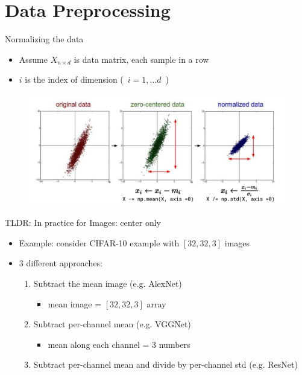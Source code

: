 \documentclass[serif, aspectratio=169]{beamer}
\begin{document}
\section{Data Preprocessing}

\begin{frame}{Normalizing the data}
	\begin{itemize}
		\item Assume $X_{n \times d}$ is data matrix, each sample in a row
		\item $i$ is the index of dimension (\ $i = 1, \dots d$\ )
	\end{itemize}
	\begin{figure}[htpb]
		\begin{center}
			\includegraphics[keepaspectratio, scale=0.3]{pic/normaliz}
		\end{center}
	\end{figure}
\end{frame}

\begin{frame}{TLDR: In practice for Images: center only}
	\begin{itemize}
		\item Example: consider CIFAR-10 example with $[32,32,3]$ images
		\item 3 different approaches:
		\begin{enumerate}
		\item Subtract the mean image (e.g. AlexNet)
			\begin{itemize}
				\item mean image = $[32,32,3]$ array
			\end{itemize}
		\item Subtract per-channel mean (e.g. VGGNet)
			\begin{itemize}
				\item mean along each channel = 3 numbers
			\end{itemize}		
		\item Subtract per-channel mean and divide by per-channel std (e.g. ResNet)
		\end{enumerate}
	\end{itemize}
\end{frame}
\end{document}
